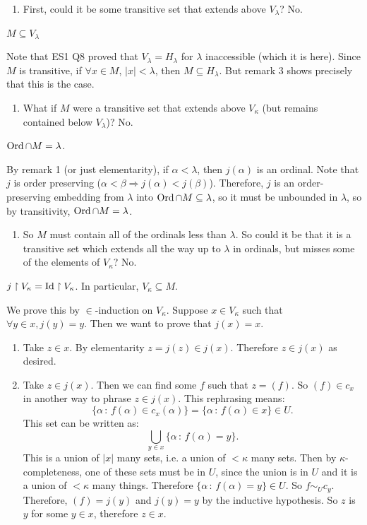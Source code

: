 \documentclass{article}
\begin{document}
\begin{enumerate}
    \item[(1)]First, could it be some transitive set that extends above $V_{\lambda}$? No.
\end{enumerate}
\begin{fancylem}{}
    $M \subseteq V_{\lambda}$
\end{fancylem}
\proof Note that ES1 Q8 proved that $V_{\lambda} = H_{\lambda}$ for $\lambda$ inaccessible (which it is here). Since $M$ is transitive, if $\forall x \in M$, $|x|<\lambda$, then $M \subseteq H_{\lambda}$. But remark 3 shows precisely that this is the case. \endproof
\begin{enumerate}
    \item[(2)] What if $M$ were a transitive set that extends above $V_{\kappa}$ (but remains contained below $V_{\lambda}$)? No.
\end{enumerate}
\begin{fancylem}{}
    $\operatorname{Ord} \cap M = \lambda$.
\end{fancylem}
\proof By remark 1 (or just elementarity), if $\alpha < \lambda$, then $j(\alpha)$ is an ordinal. Note that $j$ is order preserving ($\alpha < \beta \Rightarrow j(\alpha) < j(\beta)$). Therefore, $j$ is an order-preserving embedding from $\lambda$ into $\operatorname{Ord} \cap M \subseteq \lambda$, so it must be unbounded in $\lambda$, so by transitivity, $\operatorname{Ord} \cap M = \lambda$. \endproof
\begin{enumerate}
    \item[(3)] So $M$ must contain all of the ordinals less than $\lambda$. So could it be that it is a transitive set which extends all the way up to $\lambda$ in ordinals, but misses some of the elements of $V_{\kappa}$? No.
\end{enumerate}
\begin{fancylem}{}
    $j \upharpoonright V_{\kappa} = \operatorname{Id} \upharpoonright V_{\kappa}$. In particular, $V_{\kappa} \subseteq M$.
\end{fancylem}
\proof We prove this by $\in$-induction on $V_{\kappa}$. Suppose $x \in V_{\kappa}$ such that $\forall y \in x, j(y)=y$. Then we want to prove that $j(x)=x$. \endproof 
\begin{enumerate}
    \item[($\supseteq$)] Take $z \in x$. By elementarity $z=j(z) \in j(x)$. Therefore $z \in j(x)$ as desired.
    \item[($\subseteq$)] Take $z \in j(x)$. Then we can find some $f$ such that $z = (f)$. So $(f) \in c_{x}$ in another way to phrase $z \in j(x)$. This rephrasing means: \[ \{\alpha \, : \, f(\alpha) \in c_{x}(\alpha)\} = \{\alpha \, : \, f(\alpha) \in x\} \in U.\]
    This set can be written as: \[ \bigcup_{y \in x} \{ \alpha \, : \, f(\alpha)=y\}.\]
    This is a union of $|x|$ many sets, i.e. a union of $<\kappa$ many sets. Then by $\kappa$-completeness, one of these sets must be in $U$, since the union is in $U$ and it is a union of $<\kappa$ many things. Therefore $\{\alpha \, : \, f(\alpha)=y\} \in U$. So $f \sim_{U} c_{y}$. Therefore, $(f) = j(y)$ and $j(y)=y$ by the inductive hypothesis. So $z$ is $y$ for some $y \in x$, therefore $z \in x$.
\end{enumerate}
\end{document}
